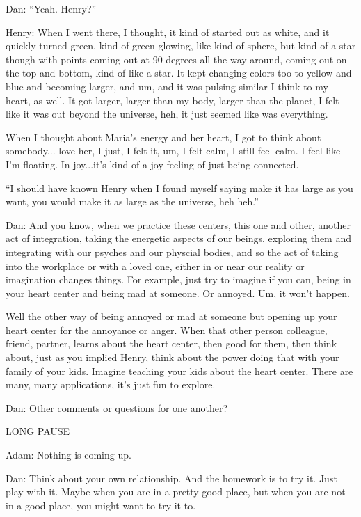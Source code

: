 \documentclass[12pt]{book}
\begin{document}
Dan: “Yeah. Henry?”
					
Henry: When I went there, I thought, it kind of started out as white, and it quickly turned green, kind of green glowing, like kind of sphere, but kind of a star though with points coming out at 90 degrees all the way around, coming out on the top and bottom, kind of like a star. It kept changing colors too to yellow and blue and becoming larger, and um, and it was pulsing similar I think to my heart, as well. It got larger, larger than my body, larger than the planet, I felt like it was out beyond the universe, heh, it just seemed like was everything.
					
When I thought about Maria’s energy and her heart, I got to think about somebody... love her, I just, I felt it, um, I felt calm, I still feel calm. I feel like I’m floating. In joy...it’s kind of a joy feeling of just being connected.



``I should have known Henry when I found myself saying make it has large as you want,
you would make it as large as the universe, heh heh.''

Dan: And you know, when we practice these centers, this one and other, another act of integration,
taking the energetic aspects of our beings, exploring them and integrating with our psyches and our physcial bodies,
and so the act of taking into the workplace or with a loved one, either in or near our reality or imagination changes things.
For example, just try to imagine if you can, being in your heart center and being mad at someone. Or annoyed. Um, it won't happen.

Well the other way of being annoyed or mad at someone but opening up your heart center for the annoyance or anger.
When that other person colleague, friend, partner, learns about the heart center, then good for them, then think about,
just as you implied Henry, think about the power doing that with your family of your kids. Imagine teaching your
kids about the heart center. There are many, many applications, it's just fun to explore.

Dan: Other comments or questions for one another?

LONG PAUSE

Adam: Nothing is coming up.

Dan: Think about your own relationship. And the homework is to try it. Just play with it. Maybe when you are in a pretty good place,
but when you are not in a good place, you might want to try it to.
\end{document}
